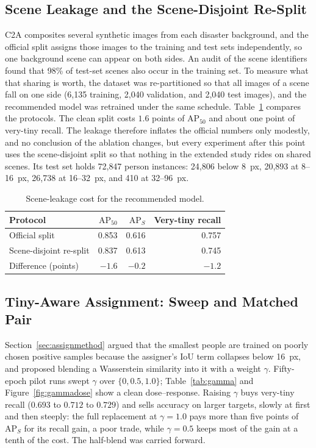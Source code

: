 \subsection{Scene Leakage and the Scene-Disjoint Re-Split}
\label{sec:leak}
C2A composites several synthetic images from each disaster background, and the
official split assigns those images to the training and test sets
independently, so one background scene can appear on both sides. An audit of
the scene identifiers found that 98\% of test-set scenes also occur in the
training set. To measure what that sharing is worth, the dataset was
re-partitioned so that all images of a scene fall on one side (6{,}135
training, 2{,}040 validation, and 2{,}040 test images), and the recommended
model was retrained under the same schedule. Table~\ref{tab:leak} compares the
protocols. The clean split costs $1.6$ points of $\mathrm{AP}_{50}$ and about
one point of very-tiny recall. The leakage therefore inflates the official
numbers only modestly, and no conclusion of the ablation changes, but every
experiment after this point uses the scene-disjoint split so that nothing in
the extended study rides on shared scenes. Its test set holds 72{,}847 person
instances: 24{,}806 below 8~px, 20{,}893 at 8--16~px, 26{,}738 at 16--32~px,
and 410 at 32--96~px.

\begin{table}[tbp]
  \centering
  \caption{Scene-leakage cost for the recommended model.}
  \label{tab:leak}
  \begin{tabular}{@{}l r r r@{}}
    \toprule
    \bfseries\boldmath Protocol& \bfseries\boldmath $\mathrm{AP}_{50}$& \bfseries\boldmath $\mathrm{AP}_S$& \bfseries\boldmath Very-tiny recall\\
    \midrule
    Official split          & 0.853 & 0.616 & 0.757 \\
    Scene-disjoint re-split & 0.837 & 0.613 & 0.745 \\
    Difference (points)     & $-1.6$ & $-0.2$ & $-1.2$ \\
    \bottomrule
  \end{tabular}
\end{table}

\subsection{Tiny-Aware Assignment: Sweep and Matched Pair}
\label{sec:assignresults}
Section~\ref{sec:assignmethod} argued that the smallest people are trained on
poorly chosen positive samples because the assigner's IoU term collapses below
16~px, and proposed blending a Wasserstein similarity into it with a weight
$\gamma$. Fifty-epoch pilot runs swept $\gamma$ over $\{0, 0.5, 1.0\}$;
Table~\ref{tab:gamma} and Figure~\ref{fig:gammadose} show a clean
dose--response. Raising $\gamma$ buys very-tiny recall ($0.693$ to $0.712$ to
$0.729$) and sells accuracy on larger targets, slowly at first and then
steeply: the full replacement at $\gamma=1.0$ pays more than five points of
$\mathrm{AP}_S$ for its recall gain, a poor trade, while $\gamma=0.5$ keeps
most of the gain at a tenth of the cost. The half-blend was carried forward.

